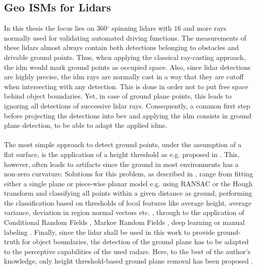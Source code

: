 \subsection{Geo ISMs for Lidars}
\label{subsec:geo_ism_lidar}
In this thesis the focus lies on 360$^\circ$ spinning lidars with $16$ and more rays normally used for validating automated driving functions. The measurements of these lidars almost always contain both detections belonging to obstacles and drivable ground points. Thus, when applying the classical ray-casting approach, the \gls{idm} would mark ground points as occupied space. Also, since lidar detections are highly precise, the \gls{idm} rays are normally cast in a way that they are cutoff when intersecting with any detection. This is done in order not to put free space behind object boundaries. Yet, in case of ground plane points, this leads to ignoring all detections of successive lidar rays. Consequently, a common first step before projecting the detections into \gls{bev} and applying the \gls{idm} consists in ground plane detection, to be able to adapt the applied \gls{idm}s. 
\\\\
The most simple approach to detect ground points, under the assumption of a flat surface, is the application of a height threshold as e.g. proposed in \cite{thrun2006stanley}. This, however, often leads to artifacts since the ground in most environments has a non-zero curvature. Solutions for this problem, as described in \cite{narksri2018slope}, range from fitting either a single plane or piece-wise planar model e.g. using RANSAC or the Hough transform \cite{fischler1981random,hough1962method,oliveira2016scene,tian2020fast} and classifying all points within a given distance as ground, performing the classification based on thresholds of local features like average height, average variance, deviation in region normal vectors etc. \cite{li2014motion,asvadi2015detection}, through to the application of Conditional Random Fields \cite{rummelhard2017ground}, Markov Random Fields \cite{guo2011graph}, deep learning \cite{zhang2014loam} or manual labeling \cite{velas2018cnn}. Finally, since the lidar shall be used in this work to provide ground-truth for object boundaries, the detection of the ground plane has to be adapted to the perceptive capabilities of the used radars. Here, to the best of the author's knowledge, only height threshold-based ground plane removal has been proposed \cite{weston2019probably,sless2019road}.
\\\\
